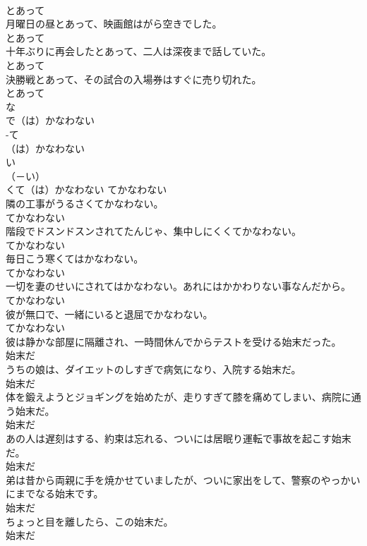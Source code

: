 \documentclass[8pt]{extreport}
\begin{document}
\begin{CJK}{UTF8}{min}
\\	とあって	
\\	月曜日の昼とあって、映画館はがら空きでした。	
\\	とあって	
\\	十年ぶりに再会したとあって、二人は深夜まで話していた。	
\\	とあって	
\\	決勝戦とあって、その試合の入場券はすぐに売り切れた。	
\\	とあって	
\\	な
\\	で（は）かなわない	
\\	-て
\\	（は）かなわない	
\\	い
\\	（－い） 
\\	くて（は）かなわない	てかなわない	
\\	隣の工事がうるさくてかなわない。	
\\	てかなわない	
\\	階段でドスンドスンされてたんじゃ、集中しにくくてかなわない。	
\\	てかなわない	
\\	毎日こう寒くてはかなわない。	
\\	てかなわない	
\\	一切を妻のせいにされてはかなわない。あれにはかかわりない事なんだから。	
\\	てかなわない	
\\	彼が無口で、一緒にいると退屈でかなわない。	
\\	てかなわない	
\\	彼は静かな部屋に隔離され、一時間休んでからテストを受ける始末だった。	
\\	始末だ	
\\	うちの娘は、ダイエットのしすぎで病気になり、入院する始末だ。	
\\	始末だ	
\\	体を鍛えようとジョギングを始めたが、走りすぎて膝を痛めてしまい、病院に通う始末だ。	
\\	始末だ	
\\	あの人は遅刻はする、約束は忘れる、ついには居眠り運転で事故を起こす始末だ。	
\\	始末だ	
\\	弟は昔から両親に手を焼かせていましたが、ついに家出をして、警察のやっかいにまでなる始末です。	
\\	始末だ	
\\	ちょっと目を離したら、この始末だ。	
\\	始末だ	

\end{CJK}
\end{document}
